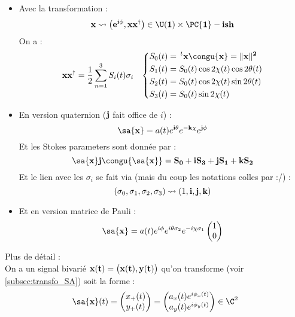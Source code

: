\begin{itemize}
	
	\item Avec la transformation :
	\[\bf{x} \leadsto \big(e^{i\phi}, \bf{x}\bf{x}^\dagger\big)\in\U(1)\times \PC{1}-ish\]
	On a :
	\begin{align*}
		\bf{x}\bf{x}^\dagger &= \frac{1}{2}\sum_{n=1}^3 S_i(t)\sigma_i  &  \left\{\begin{aligned}
			S_0(t) &=\, ^t\bf{x}\congu{\bf{x}} = \|\bf{x}\|^2 \\
			S_1(t) &= S_0(t) \cos 2\chi(t)\cos 2\theta(t)\\
			S_2(t) &= S_0(t) \cos 2\chi(t)\sin 2\theta(t)\\
			S_3(t) &= S_0(t) \sin 2\chi(t)
		\end{aligned} \right.
	\end{align*}
	
	\item En version quaternion ($\bf{j}$ fait office de $i$) \cite{lefevre_polarization_2021} :
	\begin{equation}
		\sa{\bf{x}} = a(t)e^{\bf{i}\theta} e^{-\bf{k}\chi} e^{\bf{j}\phi}
	\end{equation}
	Et les Stokes parameters sont donnée par :
	\[\sa{\bf{x}} \bf{j} \congu{\sa{\bf{x}}} = S_0  +\bf{i}S_3 + \bf{j}S_1 + \bf{k}S_2\]
	Et le lien avec les $\sigma_i$ se fait via (mais du coup les notations colles par :/) :
	\[(\sigma_0, \sigma_1, \sigma_2, \sigma_3) \leadsto (1, \bf{i}, \bf{j}, \bf{k})\]
	
	\item Et en version matrice de Pauli :
	\begin{equation}
		\sa{\bf{x}} = a(t)e^{i\phi} e^{i\theta \sigma_2} e^{-i\chi \sigma_1} \begin{pmatrix} 1 \\ 0 \end{pmatrix}
	\end{equation}
\end{itemize}
\noindent
Plus de détail : \\ 

On a un signal bivarié $\bf{x}(t) = \big(x(t),y(t)\big)$ qu'on transforme (voir \cref{subsec:transfo_SA}) soit la forme :
\[\sa{\bf{x}}(t) = \begin{pmatrix}x_+(t) \\ y_+(t)\end{pmatrix} = \begin{pmatrix}a_x(t) e^{i\phi_x(t)} \\ a_y(t) e^{i\phi_y(t)}\end{pmatrix}\in\C^2\]
\\

